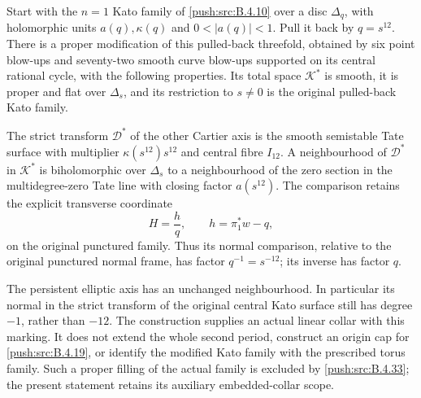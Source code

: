 \begin{proposition}\label{push:src:B.4.21}
Start with the $n=1$ Kato family of \ref{push:src:B.4.10} over a disc
$\Delta_q$, with holomorphic units $a(q),\kappa(q)$ and
$0<|a(q)|<1$.  Pull it back by $q=s^{12}$.
There is a proper modification of this pulled-back threefold,
obtained by six point blow-ups and seventy-two smooth curve
blow-ups supported on its central rational cycle, with the
following properties.  Its total space $\mathcal K^*$ is smooth,
it is proper and flat over $\Delta_s$, and its restriction to
$s\ne0$ is the original pulled-back Kato family.

The strict transform $\mathcal D^*$ of the other Cartier axis
is the smooth semistable Tate surface with multiplier
$\kappa(s^{12})s^{12}$ and central fibre $I_{12}$.  A neighbourhood
of $\mathcal D^*$ in $\mathcal K^*$ is biholomorphic over
$\Delta_s$ to a neighbourhood of the zero section in the
multidegree-zero Tate line with closing factor $a(s^{12})$.
The comparison retains the explicit transverse coordinate
\[
 H=\frac{h}{q},\qquad h=\pi_1^*w-q,
 \tag{B.4.21.1}
\]
on the original punctured family.  Thus its normal comparison,
relative to the original punctured normal frame, has factor
$q^{-1}=s^{-12}$; its inverse has factor $q$.

The persistent elliptic axis has an unchanged neighbourhood.
In particular its normal in the strict transform of the original
central Kato surface still has degree $-1$, rather than $-12$.
The construction supplies an actual linear collar with this
marking.  It does not extend the whole second period, construct
an origin cap for \ref{push:src:B.4.19}, or identify the modified Kato family
with the prescribed torus family. Such a proper filling of
the actual family is excluded by \ref{push:src:B.4.33}; the present
statement retains its auxiliary embedded-collar scope.
\end{proposition}

